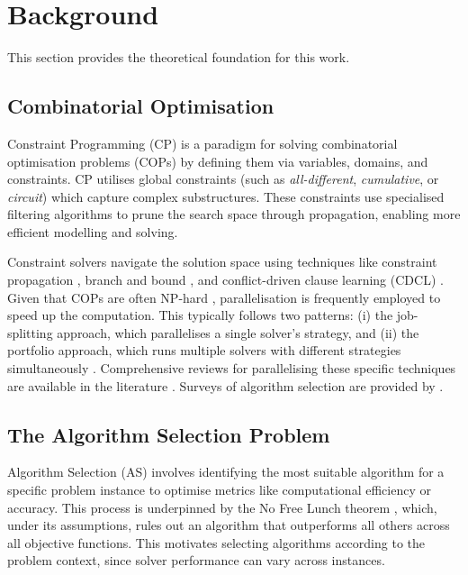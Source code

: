 \section{Background}
This section provides the theoretical foundation for this work.

\subsection{Combinatorial Optimisation}
Constraint Programming (CP) \citep{rossi2006handbook} is a paradigm for solving combinatorial optimisation problems (COPs) by defining them via variables, domains, and constraints. CP utilises global constraints (such as \textit{all-different}, \textit{cumulative}, or \textit{circuit}) which capture complex substructures. These constraints use specialised filtering algorithms to prune the search space through propagation, enabling more efficient modelling and solving.

Constraint solvers navigate the solution space using techniques like constraint propagation \citep{bessiere2006constraint}, branch and bound \citep{boyd2007branch}, and conflict-driven clause learning (CDCL) \citep{marques2009conflict}. Given that COPs are often NP-hard \citep{Papadimitriou_book}, parallelisation is frequently employed to speed up the computation. This typically follows two patterns: (i) the job-splitting approach, which parallelises a single solver's strategy, and (ii) the portfolio approach, which runs multiple solvers with different strategies simultaneously \citep{paper_amai}. Comprehensive reviews for parallelising these specific techniques are available in the literature \citep{gent2018review,crainic2006parallel,martins2012overview}. Surveys of algorithm selection are provided by \citet{kerschke2019automated,kotthoff2016algorithm}.

\subsection{The Algorithm Selection Problem}
Algorithm Selection (AS) involves identifying the most suitable algorithm for a specific problem instance to optimise metrics like computational efficiency or accuracy. This process is underpinned by the No Free Lunch theorem \citep{wolpert1997no}, which, under its assumptions, rules out an algorithm that outperforms all others across all objective functions. This motivates selecting algorithms according to the problem context, since solver performance can vary across instances.

